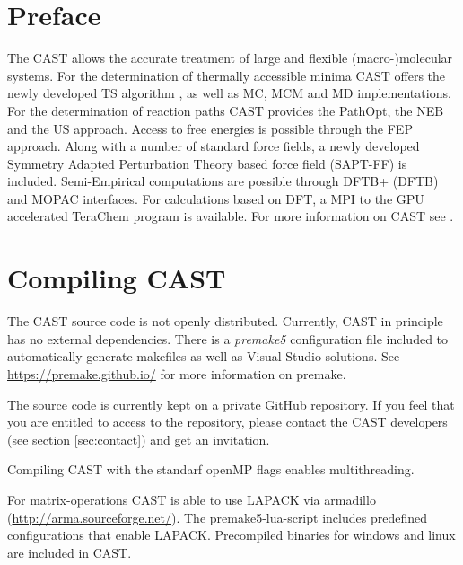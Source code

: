 \documentclass[10pt,a4paper]{article} %
\newif\ifdevelopment %
\begin{document}
	\section{Preface}
	The \ac{CAST} allows the accurate treatment of large and flexible (macro-)molecular systems. For the determination of thermally accessible minima \ac{CAST} offers the newly developed \ac{TS} algorithm \supercite{tabusearch}, as well as \ac{MC}\supercite{mc_original}, \ac{MCM}\supercite{MCM_original} and \acf{MD}\supercite{computer_simulation_of_MD} implementations. For the determination of reaction paths \ac{CAST} provides the PathOpt\supercite{pathopt}, the \ac{NEB}\supercite{neb_original} and the \ac{US}\supercite{umbrella_sampling} approach. Access to free energies is possible through the \ac{FEP} approach. Along with a number of standard force fields, a newly developed Symmetry Adapted Perturbation Theory based force field (\acs{SAPT-FF}) is included. Semi-Empirical computations are possible through DFTB+\supercite{dftb} (\acl{DFTB}) and \ac{MOPAC}\supercite{mopac, mopac_parallel} interfaces. For calculations based on \ac{DFT}, a \ac{MPI} to the \acs{GPU} accelerated TeraChem\supercite{terachem} program is available. For more information on \ac{CAST} see \cite{cast}.
	\newpage
	
	
	\ifdevelopment
	\section{Compiling CAST} \label{sec:compile}
	The \ac{CAST} source code is not openly distributed. Currently, \ac{CAST} in principle has no external dependencies. There is a \textit{premake5} configuration file included to automatically generate makefiles as well as Visual Studio solutions. See \url{https://premake.github.io/} for more information on premake.
	
	The source code is currently kept on a private GitHub repository. If you feel that you are entitled to access to the repository, please contact the \ac{CAST} developers (see section \ref{sec:contact}) and get an invitation.
	
	Compiling \ac{CAST} with the standarf openMP flags enables multithreading.
	
	For matrix-operations \ac{CAST} is able to use \ac{LAPACK} via armadillo (\url{http://arma.sourceforge.net/}). The premake5-lua-script includes predefined configurations that enable LAPACK. Precompiled binaries for windows and linux are included in \ac{CAST}.
	
\end{document}
